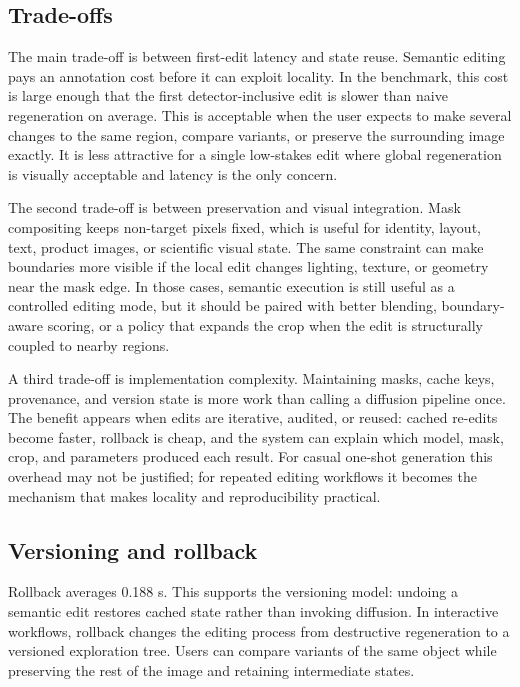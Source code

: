 \documentclass[final,5p,times,number,sort&compress]{elsarticle}
\begin{document}
\subsection{Trade-offs}

The main trade-off is between first-edit latency and state reuse. Semantic editing pays an annotation cost before it can exploit locality. In the benchmark, this cost is large enough that the first detector-inclusive edit is slower than naive regeneration on average. This is acceptable when the user expects to make several changes to the same region, compare variants, or preserve the surrounding image exactly. It is less attractive for a single low-stakes edit where global regeneration is visually acceptable and latency is the only concern.

The second trade-off is between preservation and visual integration. Mask compositing keeps non-target pixels fixed, which is useful for identity, layout, text, product images, or scientific visual state. The same constraint can make boundaries more visible if the local edit changes lighting, texture, or geometry near the mask edge. In those cases, semantic execution is still useful as a controlled editing mode, but it should be paired with better blending, boundary-aware scoring, or a policy that expands the crop when the edit is structurally coupled to nearby regions.

A third trade-off is implementation complexity. Maintaining masks, cache keys, provenance, and version state is more work than calling a diffusion pipeline once. The benefit appears when edits are iterative, audited, or reused: cached re-edits become faster, rollback is cheap, and the system can explain which model, mask, crop, and parameters produced each result. For casual one-shot generation this overhead may not be justified; for repeated editing workflows it becomes the mechanism that makes locality and reproducibility practical.

\subsection{Versioning and rollback}

Rollback averages 0.188 s. This supports the versioning model: undoing a semantic edit restores cached state rather than invoking diffusion. In interactive workflows, rollback changes the editing process from destructive regeneration to a versioned exploration tree. Users can compare variants of the same object while preserving the rest of the image and retaining intermediate states.
\end{document}

